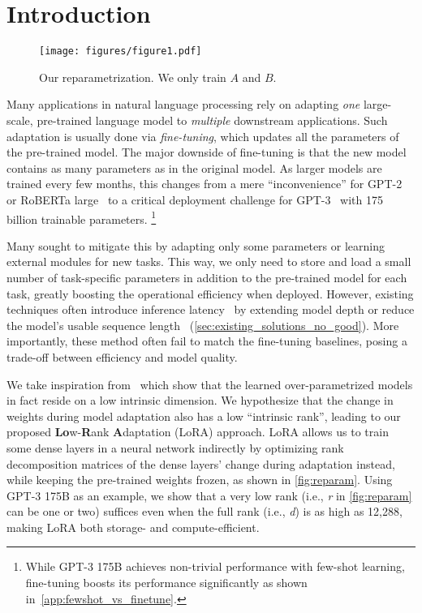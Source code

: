 \section{Introduction}

\begin{wrapfigure}{r}{0.29\textwidth}
  \centering
  \texttt{[image: figures/figure1.pdf]}
  \caption{Our reparametrization. We only train $A$ and $B$.}
  \label{fig:reparam}
\end{wrapfigure}

Many applications in natural language processing rely on adapting \emph{one} large-scale, pre-trained language model to \emph{multiple} downstream applications.
Such adaptation is usually done via \emph{fine-tuning}, which updates all the parameters of the pre-trained model.
The major downside of fine-tuning is that the new model contains as many parameters as in the original model.
As larger models are trained every few months, this changes from a mere ``inconvenience'' for GPT-2~\citep{radford_language_nodate} or RoBERTa large~\citep{liu2019roberta} to a critical deployment challenge for GPT-3~\citep{brown_language_2020} with 175 billion trainable parameters.%
\footnote{While GPT-3 175B achieves non-trivial performance with few-shot learning, fine-tuning boosts its performance significantly as shown in~\autoref{app:fewshot_vs_finetune}.}





Many sought to mitigate this by adapting only some parameters or learning external modules for new tasks.
This way, we only need to store and load a small number of task-specific parameters in addition to the pre-trained model for each task, greatly boosting the operational efficiency when deployed.
However, existing techniques often introduce inference latency~\citep{houlsby_parameter-efficient_2019, rebuffi_learning_2017} by extending model depth or reduce the model's usable sequence length~\citep{li_prefix-tuning_2021, lester_power_2021, hambardzumyan_warp_2020, liu_gpt_2021} (\autoref{sec:existing_solutions_no_good}).
More importantly, these method often fail to match the fine-tuning baselines, posing a trade-off between efficiency and model quality.


We take inspiration from~\cite{li_measuring_2018, aghajanyan_intrinsic_2020} which show that the learned over-parametrized models in fact reside on a low intrinsic dimension.
We hypothesize that the change in weights during model adaptation also has a low ``intrinsic rank'', leading to our proposed \textbf{Lo}w-\textbf{R}ank \textbf{A}daptation (LoRA) approach.
LoRA allows us to train some dense layers in a neural network indirectly by optimizing rank decomposition matrices of the dense layers' change during adaptation instead, while keeping the pre-trained weights frozen, as shown in \autoref{fig:reparam}.
Using GPT-3 175B as an example, we show that a very low rank (i.e., \textit{r} in \autoref{fig:reparam} can be one or two) suffices even when the full rank (i.e., \textit{d}) is as high as 12,288, making LoRA both storage- and compute-efficient.


